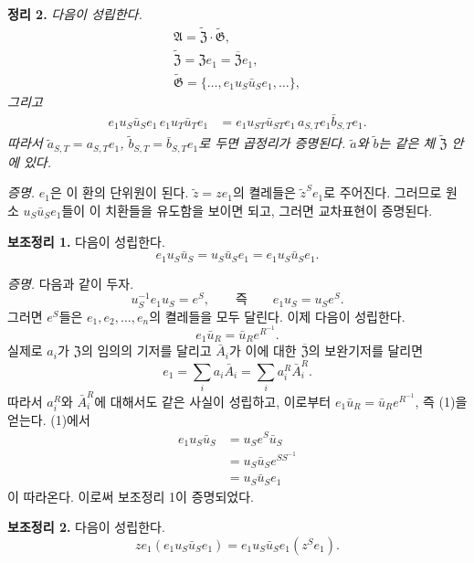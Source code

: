 \noindent\textbf{정리 2.} \emph{다음이 성립한다.}
\[
\begin{gathered}
\mathfrak A
 =\widetilde{\mathfrak Z}
  \mathbin{\cdot}\widetilde{\mathfrak G},\\
\widetilde{\mathfrak Z}
 =\mathfrak Ze_1
 =\overline{\mathfrak Z}e_1,\\
\widetilde{\mathfrak G}
 =\{\ldots,e_1u_S\bar u_Se_1,\ldots\},
\end{gathered}
\]
\emph{그리고}
\[
\begin{aligned}
e_1u_S\bar u_Se_1\,
e_1u_T\bar u_Te_1
 &=e_1u_{ST}\bar u_{ST}e_1\,
   a_{S,T}e_1\bar b_{S,T}e_1.
\end{aligned}
\]
\emph{따라서 \(\tilde a_{S,T}=a_{S,T}e_1\), \(\tilde b_{S,T}=\bar b_{S,T}e_1\)로 두면 곱정리가 증명된다. \(\tilde a\)와 \(\tilde b\)는 같은 체 \(\widetilde{\mathfrak Z}\) 안에 있다.}

\noindent\emph{증명.} \(e_1\)은 이 환의 단위원이 된다. \(\tilde z=ze_1\)의 켤레들은 \(\tilde z^Se_1\)로 주어진다. 그러므로 원소 \(u_S\bar u_Se_1\)들이 이 치환들을 유도함을 보이면 되고, 그러면 교차표현이 증명된다.

\noindent\textbf{보조정리 1.} 다음이 성립한다.
\[
        e_1u_S\bar u_S
        =u_S\bar u_Se_1
        =e_1u_S\bar u_Se_1.
\]

\noindent\emph{증명.} 다음과 같이 두자.
\[
        u_S^{-1}e_1u_S=e^S,
        \qquad\text{즉}\qquad
        e_1u_S=u_Se^S.
\]
그러면 \(e^S\)들은 \(e_1,e_2,\ldots,e_n\)의 켤레들을 모두 달린다. 이제 다음이 성립한다.
\[
        e_1\bar u_R=\bar u_Re^{R^{-1}}.
        \tag{1}
\]
실제로 \(a_i\)가 \(\mathfrak Z\)의 임의의 기저를 달리고 \(\bar A_i\)가 이에 대한 \(\overline{\mathfrak Z}\)의 보완기저를 달리면
\[
        e_1=\sum_i a_i\bar A_i
            =\sum_i a_i^R\bar A_i^R.
\]
따라서 \(a_i^R\)와 \(\bar A_i^R\)에 대해서도 같은 사실이 성립하고, 이로부터 \(e_1\bar u_R=\bar u_Re^{R^{-1}}\), 즉 (1)을 얻는다. (1)에서
\[
\begin{aligned}
e_1u_S\bar u_S
 &=u_Se^S\bar u_S\\
 &=u_S\bar u_Se^{SS^{-1}}\\
 &=u_S\bar u_Se_1
\end{aligned}
\]
이 따라온다. 이로써 보조정리 1이 증명되었다.

\noindent\textbf{보조정리 2.} 다음이 성립한다.
\[
        ze_1(e_1u_S\bar u_Se_1)
        =e_1u_S\bar u_Se_1(z^Se_1).
\]

